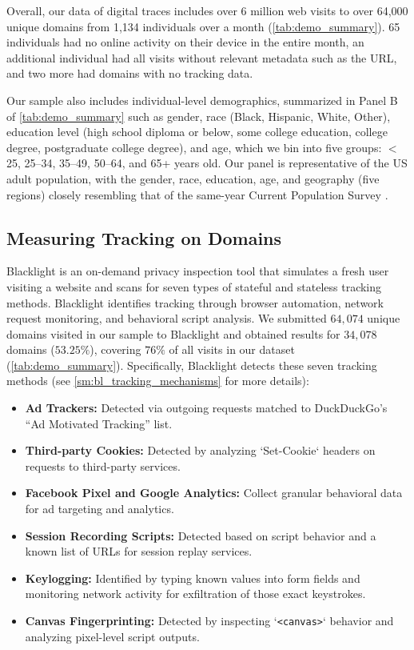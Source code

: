 \documentclass[12pt, letterpaper]{article}
\begin{document}


Overall, our data of digital traces includes over 6 million web visits to over 64,000 unique domains from 1,134 individuals over a month (\cref{tab:demo_summary}). 65 individuals had no online activity on their device in the entire month, an additional individual had all visits without relevant metadata such as the URL, and two more had domains with no tracking data.

Our sample also includes individual-level demographics, summarized in Panel B of \cref{tab:demo_summary} such as gender, race (Black, Hispanic, White, Other), education level (high school diploma or below, some college education, college degree, postgraduate college degree), and age, which we bin into five groups: $<$ 25, 25--34, 35--49, 50--64, and 65+ years old. Our panel is representative of the US adult population, with the gender, race, education, age, and geography (five regions) closely resembling that of the same-year Current Population Survey \citep{bad_domains}.


\subsection{Measuring Tracking on Domains}
\label{sec:blacklight}
Blacklight is an on-demand privacy inspection tool that simulates a fresh user visiting a website and scans for seven types of stateful and stateless tracking methods. Blacklight identifies tracking through browser automation, network request monitoring, and behavioral script analysis. We submitted $64{,}074$ unique domains visited in our sample to Blacklight and obtained results for $34{,}078$ domains ($53.25\%$), covering $76\%$ of all visits in our dataset (\cref{tab:demo_summary}). Specifically, Blacklight detects these seven tracking methods (see \cref{sm:bl_tracking_mechanisms} for more details):
\begin{itemize}\itemsep0pt
    \footnotesize
    \item \textbf{Ad Trackers:} Detected via outgoing requests matched to DuckDuckGo’s ``Ad Motivated Tracking'' list.
    \item \textbf{Third-party Cookies:} Detected by analyzing `Set-Cookie` headers on requests to third-party services.
    \item \textbf{Facebook Pixel and Google Analytics:} Collect granular behavioral data for ad targeting and analytics.
    \item \textbf{Session Recording Scripts:} Detected based on script behavior and a known list of URLs for session replay services.
    \item \textbf{Keylogging:} Identified by typing known values into form fields and monitoring network activity for exfiltration of those exact keystrokes.
    \item \textbf{Canvas Fingerprinting:} Detected by inspecting `\texttt{<canvas>}` behavior and analyzing pixel-level script outputs.
\end{itemize}
\end{document}
